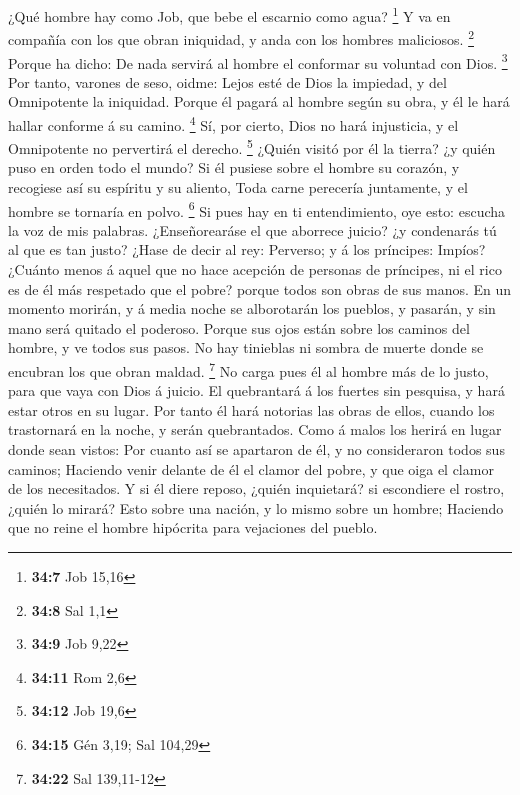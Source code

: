  ¿Qué hombre hay como Job, que bebe el escarnio como agua?
\footnote{\textbf{34:7} Job 15,16}  Y va en compañía con los
que obran iniquidad, y anda con los hombres maliciosos. \footnote{\textbf{34:8}
  Sal 1,1}  Porque ha dicho: De nada servirá al hombre el
conformar su voluntad con Dios. \footnote{\textbf{34:9} Job 9,22}
 Por tanto, varones de seso, oidme: Lejos esté de Dios la
impiedad, y del Omnipotente la iniquidad.  Porque él pagará
al hombre según su obra, y él le hará hallar conforme á su camino.
\footnote{\textbf{34:11} Rom 2,6}  Sí, por cierto, Dios no
hará injusticia, y el Omnipotente no pervertirá el derecho. \footnote{\textbf{34:12}
  Job 19,6}  ¿Quién visitó por él la tierra? ¿y quién puso
en orden todo el mundo?  Si él pusiese sobre el hombre su
corazón, y recogiese así su espíritu y su aliento,  Toda
carne perecería juntamente, y el hombre se tornaría en polvo.
\footnote{\textbf{34:15} Gén 3,19; Sal 104,29}  Si pues hay
en ti entendimiento, oye esto: escucha la voz de mis palabras.
 ¿Enseñorearáse el que aborrece juicio? ¿y condenarás tú al
que es tan justo?  ¿Hase de decir al rey: Perverso; y á los
príncipes: Impíos?  ¿Cuánto menos á aquel que no hace
acepción de personas de príncipes, ni el rico es de él más respetado que
el pobre? porque todos son obras de sus manos.  En un
momento morirán, y á media noche se alborotarán los pueblos, y pasarán,
y sin mano será quitado el poderoso.  Porque sus ojos están
sobre los caminos del hombre, y ve todos sus pasos.  No hay
tinieblas ni sombra de muerte donde se encubran los que obran maldad.
\footnote{\textbf{34:22} Sal 139,11-12}  No carga pues él
al hombre más de lo justo, para que vaya con Dios á juicio.
 El quebrantará á los fuertes sin pesquisa, y hará estar
otros en su lugar.  Por tanto él hará notorias las obras de
ellos, cuando los trastornará en la noche, y serán quebrantados.
 Como á malos los herirá en lugar donde sean vistos:
 Por cuanto así se apartaron de él, y no consideraron todos
sus caminos;  Haciendo venir delante de él el clamor del
pobre, y que oiga el clamor de los necesitados.  Y si él
diere reposo, ¿quién inquietará? si escondiere el rostro, ¿quién lo
mirará? Esto sobre una nación, y lo mismo sobre un hombre; 
Haciendo que no reine el hombre hipócrita para vejaciones del pueblo.

